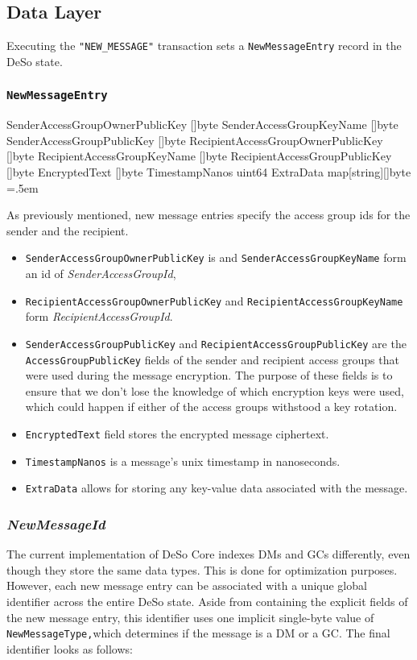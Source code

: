\documentclass[oneside, 12pt]{article}
\newenvironment{lcverbatim}
 {\SaveVerbatim{cverb}}
 {\endSaveVerbatim
  \flushleft\fboxrule=0pt\fboxsep=.5em
  \colorbox{cverbbg}{%
    \makebox[\dimexpr\linewidth-2\fboxsep][l]{\BUseVerbatim{cverb}}%
  }
  \endflushleft
}
\begin{document}
\subsection{Data Layer}
Executing the \texttt{"NEW\_MESSAGE"} transaction sets a \texttt{NewMessageEntry} record in the DeSo state.

\subsubsection{\texttt{NewMessageEntry}}
\begin{lcverbatim}
{
    SenderAccessGroupOwnerPublicKey    []byte
    SenderAccessGroupKeyName           []byte
    SenderAccessGroupPublicKey         []byte
    RecipientAccessGroupOwnerPublicKey []byte
    RecipientAccessGroupKeyName        []byte
    RecipientAccessGroupPublicKey      []byte
    EncryptedText                      []byte
    TimestampNanos                     uint64
    ExtraData                          map[string][]byte
}
\end{lcverbatim}

\noindent As previously mentioned, new message entries specify the access group ids for the sender and the recipient.

\begin{itemize}
  \item \texttt{SenderAccessGroupOwnerPublicKey} is and \texttt{SenderAccessGroupKeyName} form an id of \textit{SenderAccessGroupId},
  \item \texttt{RecipientAccessGroupOwnerPublicKey} and \texttt{RecipientAccessGroupKeyName} form \textit{RecipientAccessGroupId}.
  \item \texttt{SenderAccessGroupPublicKey} and \texttt{RecipientAccessGroupPublicKey} are the \texttt{AccessGroupPublicKey} fields of the sender and recipient access groups that were used during the message encryption. The purpose of these fields is to ensure that we don’t lose the knowledge of which encryption keys were used, which could happen if either of the access groups withstood a key rotation.
  \item \texttt{EncryptedText} field stores the encrypted message ciphertext.
  \item \texttt{TimestampNanos} is a message's unix timestamp in nanoseconds.
  \item \texttt{ExtraData} allows for storing any key-value data associated with the message.
\end{itemize}

\subsubsection{\textit{NewMessageId}}
The current implementation of DeSo Core indexes DMs and GCs differently, even though they store the same data types. This is done for optimization purposes. However, each new message entry can be associated with a unique global identifier across the entire DeSo state. Aside from containing the explicit fields of the new message entry, this identifier uses one implicit single-byte value of \texttt{NewMessageType,}which determines if the message is a DM or a GC. The final identifier looks as follows:
\end{document}
